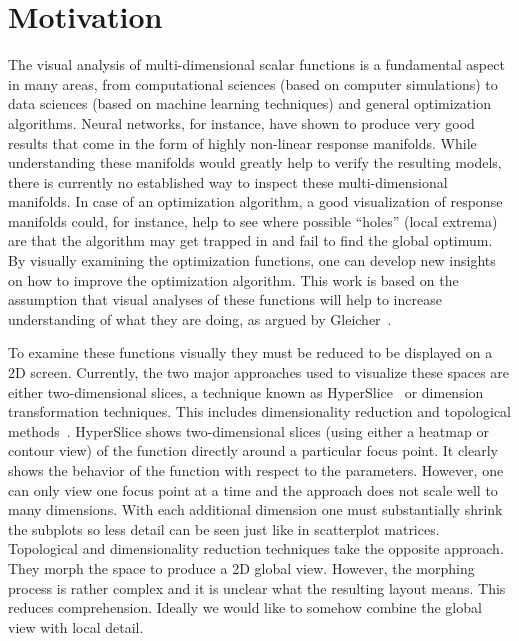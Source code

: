 \section{Motivation}\label{motivation}

The visual analysis of multi-dimensional scalar functions is a fundamental aspect in many areas, from computational sciences (based on computer simulations) to data sciences (based on machine learning techniques) and general optimization algorithms. 
Neural networks, for instance, have shown to produce very good results that come in the form of highly non-linear response manifolds.
While understanding these manifolds would greatly help to verify
the resulting models, there
is currently no established way to inspect these multi-dimensional manifolds. %
In case of an optimization algorithm, a good visualization of response manifolds could, for instance, help to see where possible
``holes'' (local extrema) are that the algorithm may get trapped in and fail to find the
global optimum. By visually examining the optimization functions,
one can develop new insights on how to improve the optimization
algorithm. This work is based on the assumption that visual analyses of these functions will help to increase
understanding of what they are doing, 
as argued by Gleicher~\cite{gleicher:2016}.

To examine these functions visually they must be reduced to be
displayed on a 2D screen. 
Currently, the two major approaches used to visualize these spaces are either
two-dimensional slices, a technique known as HyperSlice~\cite{Wijk:1993} or dimension transformation techniques. This includes dimensionality
reduction and topological methods~\cite{Correa:2011,Carr:2003a}.  HyperSlice
shows two-dimensional slices (using either a heatmap or contour view)
of the function directly around a particular focus point. It clearly shows the
behavior of the function with respect to the parameters. However, one can only
view one focus point at a time and 
the approach does not scale well to many dimensions.
With each additional dimension one must substantially 
shrink the subplots so less detail can be seen just like in scatterplot matrices. Topological and dimensionality
reduction techniques take the opposite approach. They morph the space to
produce a 2D global view. However, the morphing process is rather
complex and it is unclear what the resulting layout means. This reduces
comprehension. Ideally we would like to somehow combine the global view with
local detail.

